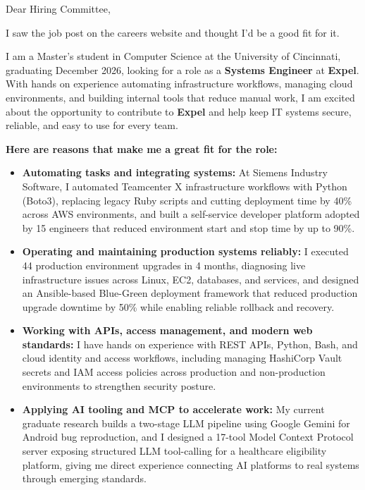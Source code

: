 \documentclass[11pt]{letter}
\date{}
\begin{document}
\begin{letter}{}

\opening{Dear Hiring Committee,}

I saw the job post on the careers website and thought I'd be a good fit for it.

I am a Master's student in Computer Science at the University of Cincinnati, graduating December 2026, looking for a role as a \textbf{Systems Engineer} at \textbf{Expel}. With hands on experience automating infrastructure workflows, managing cloud environments, and building internal tools that reduce manual work, I am excited about the opportunity to contribute to \textbf{Expel} and help keep IT systems secure, reliable, and easy to use for every team.

\textbf{Here are reasons that make me a great fit for the role:}

\begin{itemize}[leftmargin=*, itemsep=0.45em]
    \item \textbf{Automating tasks and integrating systems:} At Siemens Industry Software, I automated Teamcenter X infrastructure workflows with Python (Boto3), replacing legacy Ruby scripts and cutting deployment time by 40\% across AWS environments, and built a self-service developer platform adopted by 15 engineers that reduced environment start and stop time by up to 90\%.

    \item \textbf{Operating and maintaining production systems reliably:} I executed 44 production environment upgrades in 4 months, diagnosing live infrastructure issues across Linux, EC2, databases, and services, and designed an Ansible-based Blue-Green deployment framework that reduced production upgrade downtime by 50\% while enabling reliable rollback and recovery.

    \item \textbf{Working with APIs, access management, and modern web standards:} I have hands on experience with REST APIs, Python, Bash, and cloud identity and access workflows, including managing HashiCorp Vault secrets and IAM access policies across production and non-production environments to strengthen security posture.

    \item \textbf{Applying AI tooling and MCP to accelerate work:} My current graduate research builds a two-stage LLM pipeline using Google Gemini for Android bug reproduction, and I designed a 17-tool Model Context Protocol server exposing structured LLM tool-calling for a healthcare eligibility platform, giving me direct experience connecting AI platforms to real systems through emerging standards.


\end{itemize}
\end{letter}
\end{document}
